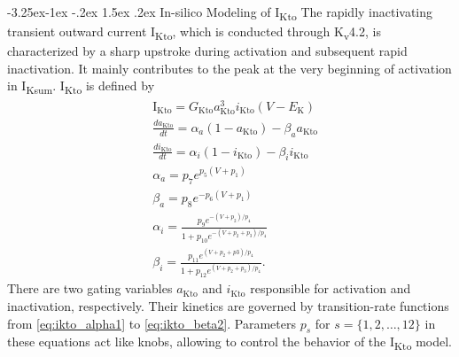 \documentclass[11pt]{article}
\makeatletter
\renewcommand\subsubsection{\@startsection{subsubsection}{3}{\z@}%
                                    {-3.25ex\@plus -1ex \@minus -.2ex}%
                                     {1.5ex \@plus .2ex}%
                                     {\normalfont\normalsize\fontfamily{phv}\fontsize{14}{17}\selectfont}}
\makeatother
\begin{document}
\subsubsection{In-silico Modeling of I\textsubscript{Kto}}
The rapidly inactivating transient outward current I\textsubscript{Kto}, which is conducted through K\textsubscript{v}4.2, is characterized by a sharp upstroke during activation and subsequent rapid inactivation. It mainly contributes to the peak at the very beginning of activation in I\textsubscript{Ksum}. I\textsubscript{Kto} is defined by
\begin{align}
    &\mathrm{I}_{\mathrm{Kto}} = G_{\mathrm{Kto}}a_{\mathrm{Kto}}^{3}i_{\mathrm{Kto}}(V-E_{\mathrm{K}}) \\
    &\frac{da_{\mathrm{Kto}}}{dt} = \alpha_{a}(1-a_{\mathrm{Kto}}) - \beta_{a}a_{\mathrm{Kto}} \\
    &\frac{di_{\mathrm{Kto}}}{dt} = \alpha_{i}(1-i_{\mathrm{Kto}}) - \beta_{i}i_{\mathrm{Kto}} \\
    &\alpha_{a} = p_{7}e^{p_{5}(V+p_{1})} \label{eq:ikto_alpha1} \\
    &\beta_{a}= p_{8}e^{-p_6(V+p_{1})} \\
    &\alpha_{i} = \frac{p_{9}e^{-(V+p_{2})/p_{4}}}{1+p_{10}e^{-(V+p_{2}+p_{3})/p_{4}}} \\
    & \beta_{i} = \frac{p_{11}e^{(V+p_{2}+p{3})/p_{4}}}{1+p_{12}e^{(V+p_{2}+p_{3})/p_{4}}}.
    \label{eq:ikto_beta2}
\end{align}
There are two gating variables $a_{\mathrm{Kto}}$ and $i_{\mathrm{Kto}}$ responsible for activation and inactivation, respectively. Their kinetics are governed by transition-rate functions from \eqref{eq:ikto_alpha1} to \eqref{eq:ikto_beta2}. Parameters $p_{s}$ for $s=\{1, 2, \dots, 12\}$ in these equations act like knobs, allowing to control the behavior of the I\textsubscript{Kto} model.
\end{document}
